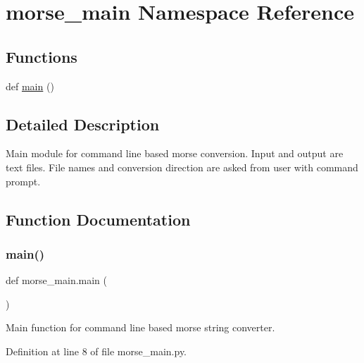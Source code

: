 \hypertarget{namespacemorse__main}{}\section{morse\+\_\+main Namespace Reference}
\label{namespacemorse__main}
\subsection*{Functions}
\begin{DoxyCompactItemize}
\item 
def \mbox{\hyperlink{namespacemorse__main_a76d936650259b2059dd69cfe7a501ff8}{main}} ()
\end{DoxyCompactItemize}


\subsection{Detailed Description}
\begin{DoxyVerb}Main module for command line based morse conversion. Input and output are text files.
   File names and conversion direction are asked from user with command prompt.
\end{DoxyVerb}
 

\subsection{Function Documentation}
\mbox{\label{namespacemorse__main_a76d936650259b2059dd69cfe7a501ff8}} 
\subsubsection{\texorpdfstring{main()}{main()}}
{\footnotesize\ttfamily def morse\+\_\+main.\+main (\begin{DoxyParamCaption}{ }\end{DoxyParamCaption})}

\begin{DoxyVerb}Main function for command line based morse string converter.
\end{DoxyVerb}
 

Definition at line 8 of file morse\+\_\+main.\+py.


